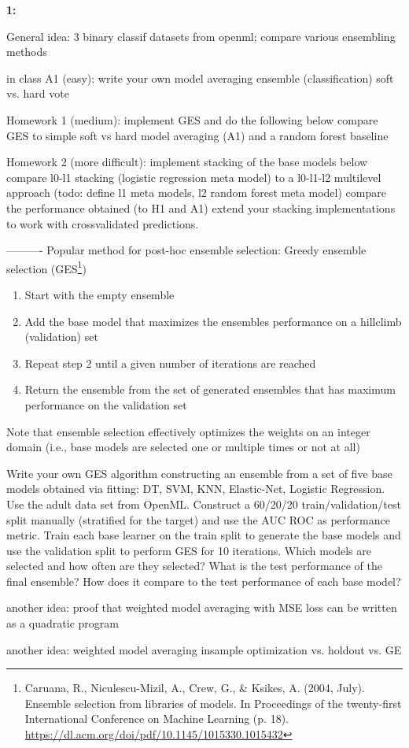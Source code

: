 \textbf{1:}\\ \noindent
\vspace{0.1cm}

General idea:
3 binary classif datasets from openml; compare various ensembling methods

in class A1 (easy):
write your own model averaging ensemble (classification)
soft vs. hard vote

Homework 1 (medium):
implement GES and do the following below
compare GES to simple soft vs hard model averaging (A1) and a random forest baseline

Homework 2 (more difficult):
implement stacking of the base models below
compare l0-l1 stacking (logistic regression meta model) to a l0-l1-l2 multilevel approach (todo: define l1 meta models, l2 random forest meta model)
compare the performance obtained (to H1 and A1)
extend your stacking implementations to work with crossvalidated predictions.

----------
Popular method for post-hoc ensemble selection: Greedy ensemble selection (GES\footnote{Caruana, R., Niculescu-Mizil, A., Crew, G., \& Ksikes, A. (2004, July). Ensemble selection from libraries of models. In Proceedings of the twenty-first International Conference on Machine Learning (p. 18). \url{https://dl.acm.org/doi/pdf/10.1145/1015330.1015432}})
\begin{enumerate}
    \item Start with the empty ensemble
    \item Add the base model that maximizes the ensembles performance on a hillclimb (validation) set
    \item Repeat step 2 until a given number of iterations are reached
    \item Return the ensemble from the set of generated ensembles that has maximum performance on the validation set
\end{enumerate}
Note that ensemble selection effectively optimizes the weights on an integer domain (i.e., base models are selected one or multiple times or not at all)

Write your own GES algorithm constructing an ensemble from a set of five base models obtained via fitting: DT, SVM, KNN, Elastic-Net, Logistic Regression.
Use the adult data set from OpenML.
Construct a 60/20/20 train/validation/test split manually (stratified for the target) and use the AUC ROC as performance metric.
Train each base learner on the train split to generate the base models and use the validation split to perform GES for 10 iterations. Which models are selected and how often are they selected?
What is the test performance of the final ensemble?
How does it compare to the test performance of each base model?

another idea:
proof that weighted model averaging with MSE loss can be written as a quadratic program


another idea:
weighted model averaging insample optimization vs. holdout vs. GE